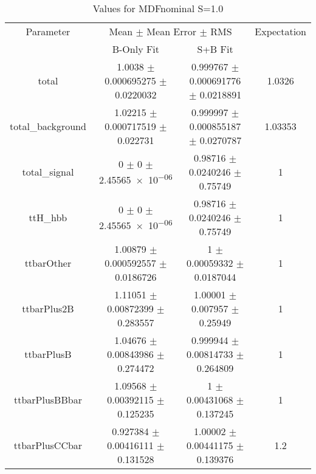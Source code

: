 \begin{table}
\centering
\caption{Values for MDFnominal S=1.0}
\begin{tabular}{cccc}
\toprule
Parameter & \multicolumn{2}{c}{Mean $\pm$ Mean Error $\pm$ RMS} & Expectation\\
 & B-Only Fit & S+B Fit & \\
\midrule
total & \num{1.0038} $\pm$ \num{0.000695275} $\pm$ \num{0.0220032} & \num{0.999767} $\pm$ \num{0.000691776} $\pm$ \num{0.0218891} & \num{1.0326}\\
total\_background & \num{1.02215} $\pm$ \num{0.000717519} $\pm$ \num{0.022731} & \num{0.999997} $\pm$ \num{0.000855187} $\pm$ \num{0.0270787} & \num{1.03353}\\
total\_signal & \num{0} $\pm$ \num{0} $\pm$ \num{2.45565e-06} & \num{0.98716} $\pm$ \num{0.0240246} $\pm$ \num{0.75749} & \num{1}\\
ttH\_hbb & \num{0} $\pm$ \num{0} $\pm$ \num{2.45565e-06} & \num{0.98716} $\pm$ \num{0.0240246} $\pm$ \num{0.75749} & \num{1}\\
ttbarOther & \num{1.00879} $\pm$ \num{0.000592557} $\pm$ \num{0.0186726} & \num{1} $\pm$ \num{0.00059332} $\pm$ \num{0.0187044} & \num{1}\\
ttbarPlus2B & \num{1.11051} $\pm$ \num{0.00872399} $\pm$ \num{0.283557} & \num{1.00001} $\pm$ \num{0.007957} $\pm$ \num{0.25949} & \num{1}\\
ttbarPlusB & \num{1.04676} $\pm$ \num{0.00843986} $\pm$ \num{0.274472} & \num{0.999944} $\pm$ \num{0.00814733} $\pm$ \num{0.264809} & \num{1}\\
ttbarPlusBBbar & \num{1.09568} $\pm$ \num{0.00392115} $\pm$ \num{0.125235} & \num{1} $\pm$ \num{0.00431068} $\pm$ \num{0.137245} & \num{1}\\
ttbarPlusCCbar & \num{0.927384} $\pm$ \num{0.00416111} $\pm$ \num{0.131528} & \num{1.00002} $\pm$ \num{0.00441175} $\pm$ \num{0.139376} & \num{1.2}\\
\bottomrule
\end{tabular}
\end{table}